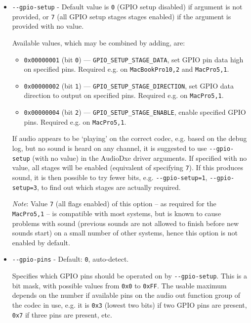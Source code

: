 \documentclass[]{article}
\providecommand{\tightlist}{%
  \setlength{\itemsep}{0pt}\setlength{\parskip}{0pt}}
\begin{document}
\begin{itemize}
  \item \texttt{-{}-gpio-setup} - Default value is \texttt{0} (GPIO setup disabled) if argument is not provided,
  or \texttt{7} (all GPIO setup stages stages enabled) if the argument is provided with no value. \medskip

  Available values, which may be combined by adding, are: \medskip

  \begin{itemize}
  \tightlist
    \item \texttt{0x00000001} (bit \texttt{0}) --- \texttt{GPIO\_SETUP\_STAGE\_DATA},
    set GPIO pin data high on specified pins. Required e.g. on \texttt{MacBookPro10,2} and \texttt{MacPro5,1}.
    \item \texttt{0x00000002} (bit \texttt{1}) --- \texttt{GPIO\_SETUP\_STAGE\_DIRECTION},
    set GPIO data direction to output on specified pins. Required e.g. on \texttt{MacPro5,1}.
    \item \texttt{0x00000004} (bit \texttt{2}) --- \texttt{GPIO\_SETUP\_STAGE\_ENABLE},
    enable specified GPIO pins. Required e.g. on \texttt{MacPro5,1}.
  \end{itemize} \medskip

  If audio appears to be `playing' on the correct codec, e.g. based on the debug log, but no
  sound is heard on any channel, it is suggested to use \texttt{-{}-gpio-setup} (with no
  value) in the AudioDxe driver arguments. If specified with no value, all
  stages will be enabled (equivalent of specifying \texttt{7}). If this produces sound,
  it is then possible to try fewer bits, e.g. \texttt{-{}-gpio-setup=1}, \texttt{-{}-gpio-setup=3},
  to find out which stages are actually required. \medskip

  \emph{Note}: Value \texttt{7} (all flags enabled) of this option -- as required for the
  \texttt{MacPro5,1} -- is compatible with most systems, but is known to cause problems with
  sound (previous sounds are not allowed to finish before new sounds start) on a small number
  of other systems, hence this option is not enabled by default. \medskip

  \item \texttt{-{}-gpio-pins} - Default: \texttt{0}, auto-detect. \medskip

  Specifies which GPIO pins should be operated on by \texttt{-{}-gpio-setup}. This is a bit mask,
  with possible values from \texttt{0x0} to \texttt{0xFF}. The usable maximum depends on
  the number if available pins on the audio out function group of the codec in use, e.g. it is
  \texttt{0x3} (lowest two bits) if two GPIO pins are present, \texttt{0x7} if three pins are present,
  etc. \medskip


\end{itemize}
\end{document}
